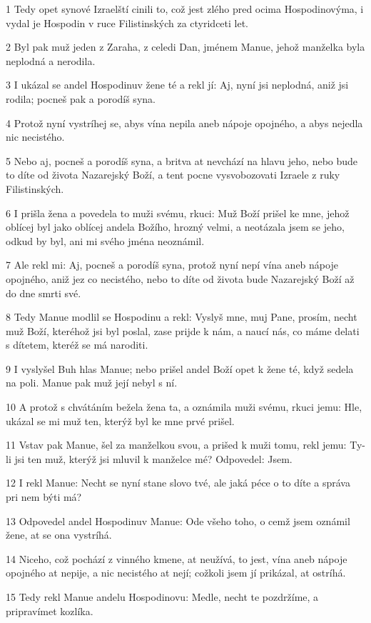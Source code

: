 \par 1 Tedy opet synové Izraelští cinili to, což jest zlého pred ocima Hospodinovýma, i vydal je Hospodin v ruce Filistinských za ctyridceti let.
\par 2 Byl pak muž jeden z Zaraha, z celedi Dan, jménem Manue, jehož manželka byla neplodná a nerodila.
\par 3 I ukázal se andel Hospodinuv žene té a rekl jí: Aj, nyní jsi neplodná, aniž jsi rodila; pocneš pak a porodíš syna.
\par 4 Protož nyní vystríhej se, abys vína nepila aneb nápoje opojného, a abys nejedla nic necistého.
\par 5 Nebo aj, pocneš a porodíš syna, a britva at nevchází na hlavu jeho, nebo bude to díte od života Nazarejský Boží, a tent pocne vysvobozovati Izraele z ruky Filistinských.
\par 6 I prišla žena a povedela to muži svému, rkuci: Muž Boží prišel ke mne, jehož oblícej byl jako oblícej andela Božího, hrozný velmi, a neotázala jsem se jeho, odkud by byl, ani mi svého jména neoznámil.
\par 7 Ale rekl mi: Aj, pocneš a porodíš syna, protož nyní nepí vína aneb nápoje opojného, aniž jez co necistého, nebo to díte od života bude Nazarejský Boží až do dne smrti své.
\par 8 Tedy Manue modlil se Hospodinu a rekl: Vyslyš mne, muj Pane, prosím, necht muž Boží, kteréhož jsi byl poslal, zase prijde k nám, a naucí nás, co máme delati s dítetem, kteréž se má naroditi.
\par 9 I vyslyšel Buh hlas Manue; nebo prišel andel Boží opet k žene té, když sedela na poli. Manue pak muž její nebyl s ní.
\par 10 A protož s chvátáním bežela žena ta, a oznámila muži svému, rkuci jemu: Hle, ukázal se mi muž ten, kterýž byl ke mne prvé prišel.
\par 11 Vstav pak Manue, šel za manželkou svou, a prišed k muži tomu, rekl jemu: Ty-li jsi ten muž, kterýž jsi mluvil k manželce mé? Odpovedel: Jsem.
\par 12 I rekl Manue: Necht se nyní stane slovo tvé, ale jaká péce o to díte a správa pri nem býti má?
\par 13 Odpovedel andel Hospodinuv Manue: Ode všeho toho, o cemž jsem oznámil žene, at se ona vystríhá.
\par 14 Niceho, což pochází z vinného kmene, at neužívá, to jest, vína aneb nápoje opojného at nepije, a nic necistého at nejí; cožkoli jsem jí prikázal, at ostríhá.
\par 15 Tedy rekl Manue andelu Hospodinovu: Medle, necht te pozdržíme, a pripravímet kozlíka.

